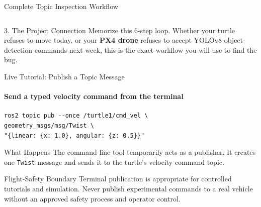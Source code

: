 \begin{frame}{Complete Topic Inspection Workflow}
\begin{columns}[T,onlytextwidth]
\end{columns}

\pause
\vspace{0.2cm}

\begin{alertblock}{3. The Project Connection}
    Memorize this 6-step loop. Whether your turtle refuses to move today, or your \textbf{PX4 drone} refuses to accept YOLOv8 object-detection commands next week, this is the exact workflow you will use to find the bug.
\end{alertblock}

\end{frame}




\begin{frame}[fragile]{Live Tutorial: Publish a Topic Message}
\framesubtitle{Send a typed velocity command from the terminal}
\scriptsize
\begin{verbatim}
ros2 topic pub --once /turtle1/cmd_vel \
geometry_msgs/msg/Twist \
"{linear: {x: 1.0}, angular: {z: 0.5}}"
\end{verbatim}
\begin{exampleblock}{What Happens}
The command-line tool temporarily acts as a publisher. It creates one \texttt{Twist} message and sends it to the turtle's velocity command topic.
\end{exampleblock}
\begin{alertblock}{Flight-Safety Boundary}
Terminal publication is appropriate for controlled tutorials and simulation. Never publish experimental commands to a real vehicle without an approved safety process and operator control.
\end{alertblock}
\end{frame}





